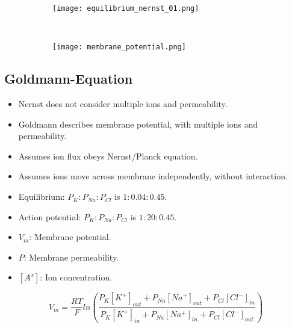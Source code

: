 \documentclass[main]{subfiles}
\begin{document}
\begin{figure}[H]
	\centering
	\begin{subfigure}[b]{0.5\textwidth}
		\centering
		\texttt{[image: equilibrium\_nernst\_01.png]}
	\end{subfigure}%
	~
	\begin{subfigure}[b]{0.3\textwidth}
		\centering
		\texttt{[image: membrane\_potential.png]}
	\end{subfigure}
\end{figure}

\subsection{Goldmann-Equation}
\begin{itemize}[noitemsep,nolistsep]
	\item Nernst does not consider multiple ions and permeability.
	\item Goldmann describes membrane potential, with multiple ions and permeability.
	\item Assumes ion flux obeys Nernst/Planck equation.
	\item Assumes ions move across membrane independently, without interaction.
	\item Equilibrium: $P_K:P_{Na}:P_{Cl}$ is $1:0.04:0.45$.
	\item Action potential: $P_K:P_{Na}:P_{Cl}$ is $1:20:0.45$.
	\item $V_m$: Membrane potential.
	\item $P$: Membrane permeability.
	\item $[A^x]$: Ion concentration.
\end{itemize}

\[V_m = \frac{RT}{F} ln(\frac{P_K[K^+]_{out} + P_{Na}[Na^+]_{out} + P_{Cl}[Cl^{-}]_{in}}{P_K[K^+]_{in} + P_{Na}[Na^+]_{in} + P_{Cl}[Cl^{-}]_{out}})\]
\end{document}
